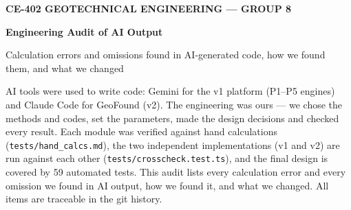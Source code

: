 \documentclass[11pt,a4paper]{article}
\newcommand{\code}[1]{\texttt{\small #1}}
\begin{document}
{\small\bfseries\color{accent}CE-402 GEOTECHNICAL ENGINEERING --- GROUP 8}\par
{\LARGE\bfseries Engineering Audit of AI Output}\par
{\color{black!65}Calculation errors and omissions found in AI-generated code, how we found them, and what we changed}\par
\vspace{2pt}{\color{navy}\rule{\textwidth}{1.5pt}}

AI tools were used to write code: Gemini for the v1 platform (P1--P5 engines) and Claude Code for GeoFound (v2). The
engineering was ours --- we chose the methods and codes, set the parameters, made the design decisions and checked
every result. Each module was verified against hand calculations (\code{tests/hand\_calcs.md}), the two independent
implementations (v1 and v2) are run against each other (\code{tests/crosscheck.test.ts}), and the final design is
covered by 59 automated tests. This audit lists every calculation error and every omission we found in AI output, how
we found it, and what we changed. All items are traceable in the git history.
\end{document}

